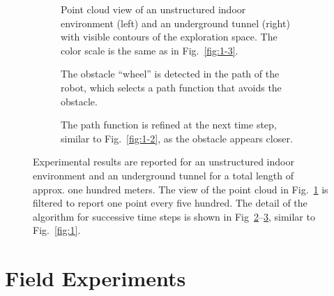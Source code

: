 \documentclass[lettersize,journal]{IEEEtran}
\theoremstyle{definition}
\begin{document}
\begin{figure*}[!ht]
  \begin{subfigure}[m]{0.48\textwidth}
    \centering
    \hspace*{-1.2cm}
    
    \caption{Point cloud view of an unstructured indoor environment (left) and an underground tunnel (right) with visible contours of the exploration space. The color scale is the same as in Fig.~\ref{fig:1-3}.}
    \label{fig:2-1}
  \end{subfigure}
  \hfill
  \begin{subfigure}[m]{0.25\textwidth}
    \centering
    
    \caption{The obstacle ``wheel'' is detected in the path of the robot, which selects a path function that avoids the obstacle.}
    \vspace*{-1cm}
    \label{fig:2-2}
  \end{subfigure}
  \hfill
  \begin{subfigure}[m]{0.25\textwidth}
    \centering
    
    \caption{The path function is refined at the next time step, similar to Fig.~\ref{fig:1-2}, as the obstacle appears closer.}
    \vspace*{-1cm}
    \label{fig:2-3}
  \end{subfigure}
  \caption{Experimental results are reported for an unstructured indoor environment and an underground tunnel for a total length of approx. one hundred meters. The view of the point cloud in Fig.~\ref{fig:2-1} is filtered to report one point every five hundred. The detail of the algorithm for successive time steps is shown in Fig~\ref{fig:2-2}--\ref{fig:2-3}, similar to Fig.~\ref{fig:1}.}
  \label{fig:2}
\end{figure*}

\section{Field Experiments}
\label{sec:fe}
\end{document}
